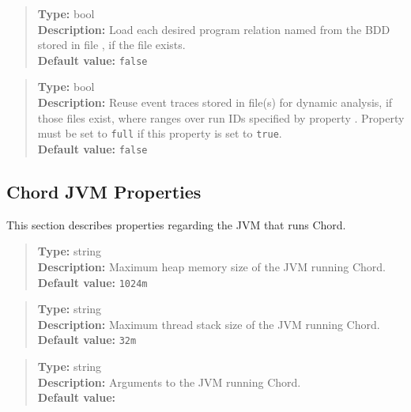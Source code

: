\begin{quote}
{\bf Type:} bool  \\
{\bf Description:} Load each desired program relation named  from the BDD stored in file , if the file exists. \\
{\bf Default value:} {\tt false}
\end{quote}

\begin{quote}
{\bf Type:} bool \\
{\bf Description:} Reuse event traces stored in file(s) \code{chord.trace.file]_full_ver0_runM.txt} for dynamic analysis, if those files exist,
where  ranges over run IDs specified by property .
Property  must be set to {\tt full} if this property is set to {\tt true}. \\
{\bf Default value:} {\tt false}
\end{quote}

\subsection{Chord JVM Properties}
\label{sec:jvm-props}

This section describes properties regarding the JVM that runs Chord.

\begin{quote}
{\bf Type:} string \\
{\bf Description:} Maximum heap memory size of the JVM running Chord. \\
{\bf Default value:} {\tt 1024m}
\end{quote}

\begin{quote}
{\bf Type:} string \\
{\bf Description:} Maximum thread stack size of the JVM running Chord. \\
{\bf Default value:} {\tt 32m}
\end{quote}

\begin{quote}
{\bf Type:} string \\
{\bf Description:} Arguments to the JVM running Chord. \\
{\bf Default value:}    
\end{quote}


